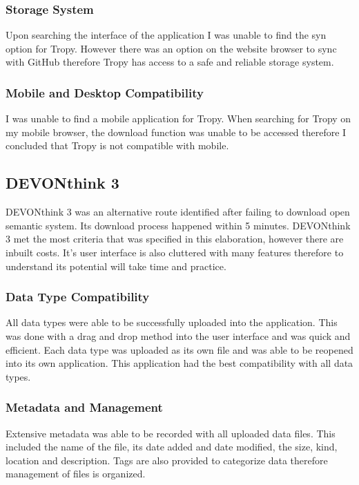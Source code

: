 \documentclass{article}
\begin{document}
\subsubsection{Storage System}
Upon searching the interface of the application I was unable to find the syn option for Tropy. However there was an option on the website browser to sync with GitHub therefore Tropy has access to a safe and reliable storage system.
\subsubsection{Mobile and Desktop Compatibility}
I was unable to find a mobile application for Tropy. When searching for Tropy on my mobile browser, the download function was unable to be accessed therefore I concluded that Tropy is not compatible with mobile. 

\subsection{DEVONthink 3}
DEVONthink 3 was an alternative route identified after failing to download open semantic system. Its download process happened within 5 minutes. DEVONthink 3 met the most criteria that was specified in this elaboration, however there are inbuilt costs. It's user interface is also cluttered with many features therefore to understand its potential will take time and practice.
\subsubsection{Data Type Compatibility}
All data types were able to be successfully uploaded into the application. This was done with a drag and drop method into the user interface and was quick and efficient. Each data type was uploaded as its own file and was able to be reopened into its own application. This application had the best compatibility with all data types.
\subsubsection{Metadata and Management}
Extensive metadata was able to be recorded with all uploaded data files. This included the name of the file, its date added and date modified, the size, kind, location and description. Tags are also provided to categorize data therefore management of files is organized. 
\end{document}
